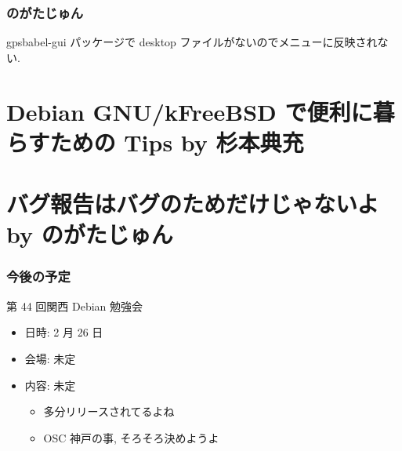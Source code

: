 \documentclass[cjk,dvipdfmx,12pt,%
hyperref={bookmarks=true,bookmarksnumbered=true,bookmarksopen=false,%
colorlinks=false,%
pdftitle={第 43 回 関西 Debian 勉強会},%
pdfauthor={倉敷・のがた・佐々木},%
pdfsubject={資料},%
}]{beamer}
\begin{document}
\begin{frame}[fragile]
\frametitle{ のがたじゅん }

gpsbabel-gui パッケージで desktop ファイルがないのでメニューに反映されない.

\end{frame}



\section{Debian GNU/kFreeBSD で便利に暮らすための Tips by 杉本典充}



\section{バグ報告はバグのためだけじゃないよ  by のがたじゅん}



\begin{frame}[fragile]
\frametitle{今後の予定}


\begin{block}{第 44 回関西 Debian 勉強会}
\begin{itemize}
  \item 日時: 2 月 26 日
  \item 会場: 未定
  \item 内容: 未定
  \begin{itemize}
    \item 多分リリースされてるよね
    \item OSC 神戸の事, そろそろ決めようよ
  \end{itemize}
\end{itemize}
\end{block}


\end{frame}



\takahashi[50]{  }
\end{document}

